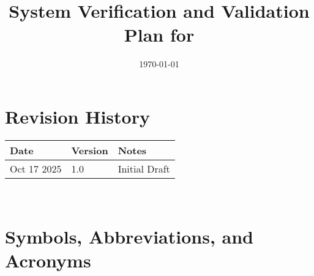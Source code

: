 \documentclass[12pt, titlepage]{article}
\begin{document}
\title{System Verification and Validation Plan for \progname{}} 
\author{\authname}
\date{\today}
	
\maketitle


\section*{Revision History}

\begin{tabularx}{\textwidth}{p{3cm}p{2cm}X}
\toprule {\bf Date} & {\bf Version} & {\bf Notes}\\
\midrule
Oct 17 2025 & 1.0 & Initial Draft\\
\bottomrule
\end{tabularx}

~\\


\newpage

\tableofcontents



\newpage

\section{Symbols, Abbreviations, and Acronyms}
\end{document}
